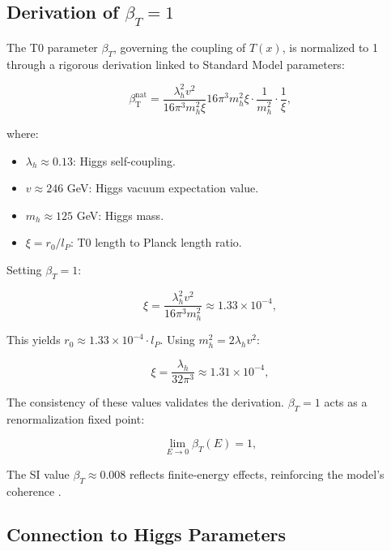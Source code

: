 \documentclass[twocolumn,aps,prl]{revtex4-2}
\newcommand{\betaT}{\beta_{\text{T}}}
\begin{document}
	\subsection{Derivation of $\beta_T = 1$}
	\label{subsec:beta_derivation}
	
	The T0 parameter $\beta_T$, governing the coupling of $T(x)$, is normalized to 1 through a rigorous derivation linked to Standard Model parameters:
	
	\begin{equation}
		\betaT^{\text{nat}} = \frac{\lambda_h^2 v^2}{16\pi^3 m_h^2 \xi}{16\pi^3 m_h^2 \xi} \cdot \frac{1}{m_h^2} \cdot \frac{1}{\xi}, \label{eq:beta_derivation}
	\end{equation}
	
	where:
	\begin{itemize}
		\item $\lambda_h \approx 0.13$: Higgs self-coupling.
		\item $v \approx 246$ GeV: Higgs vacuum expectation value.
		\item $m_h \approx 125$ GeV: Higgs mass.
		\item $\xi = r_0/l_P$: T0 length to Planck length ratio.
	\end{itemize}
	
	Setting $\beta_T = 1$:
	
	\begin{equation}
		\xi = \frac{\lambda_h^2 v^2}{16 \pi^3 m_h^2} \approx 1.33 \times 10^{-4}, \label{eq:xi_value}
	\end{equation}
	
	This yields $r_0 \approx 1.33 \times 10^{-4} \cdot l_P$. Using $m_h^2 = 2 \lambda_h v^2$:
	
	\begin{equation}
		\xi = \frac{\lambda_h}{32 \pi^3} \approx 1.31 \times 10^{-4}, \label{eq:xi_alt}
	\end{equation}
	
	The consistency of these values validates the derivation. $\beta_T = 1$ acts as a renormalization fixed point:
	
	\begin{equation}
		\lim_{E \to 0} \beta_T(E) = 1, \label{eq:beta_limit}
	\end{equation}
	
	The SI value $\beta_T \approx 0.008$ reflects finite-energy effects, reinforcing the model's coherence \cite{pascher_beta_2025}.
	
	\subsection{Connection to Higgs Parameters}
	\label{subsec:higgs}
	
\end{document}
